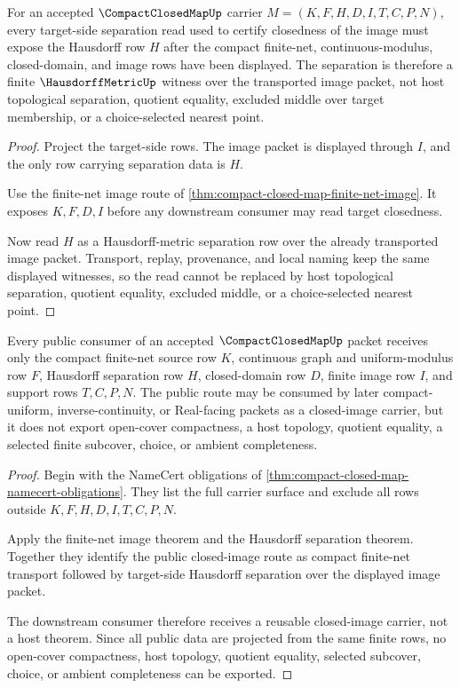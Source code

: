 \begin{theorem}
\label{thm:compact-closed-map-hausdorff-separation}
For an accepted $\CompactClosedMapUp$ carrier $M=(K,F,H,D,I,T,C,P,N)$, every target-side separation read used to certify closedness of the image must expose the Hausdorff row $H$ after the compact finite-net, continuous-modulus, closed-domain, and image rows have been displayed. The separation is therefore a finite $\HausdorffMetricUp$ witness over the transported image packet, not host topological separation, quotient equality, excluded middle over target membership, or a choice-selected nearest point.
\end{theorem}
\begin{proof}
Project the target-side rows. The image packet is displayed through $I$, and the only row carrying separation data is $H$.

Use the finite-net image route of \autoref{thm:compact-closed-map-finite-net-image}. It exposes $K,F,D,I$ before any downstream consumer may read target closedness.

Now read $H$ as a Hausdorff-metric separation row over the already transported image packet. Transport, replay, provenance, and local naming keep the same displayed witnesses, so the read cannot be replaced by host topological separation, quotient equality, excluded middle, or a choice-selected nearest point.
\end{proof}

\begin{theorem}
\label{thm:compact-closed-map-public-export}
Every public consumer of an accepted $\CompactClosedMapUp$ packet receives only the compact finite-net source row $K$, continuous graph and uniform-modulus row $F$, Hausdorff separation row $H$, closed-domain row $D$, finite image row $I$, and support rows $T,C,P,N$. The public route may be consumed by later compact-uniform, inverse-continuity, or Real-facing packets as a closed-image carrier, but it does not export open-cover compactness, a host topology, quotient equality, a selected finite subcover, choice, or ambient completeness.
\end{theorem}
\begin{proof}
Begin with the NameCert obligations of \autoref{thm:compact-closed-map-namecert-obligations}. They list the full carrier surface and exclude all rows outside $K,F,H,D,I,T,C,P,N$.

Apply the finite-net image theorem and the Hausdorff separation theorem. Together they identify the public closed-image route as compact finite-net transport followed by target-side Hausdorff separation over the displayed image packet.

The downstream consumer therefore receives a reusable closed-image carrier, not a host theorem. Since all public data are projected from the same finite rows, no open-cover compactness, host topology, quotient equality, selected subcover, choice, or ambient completeness can be exported.
\end{proof}

